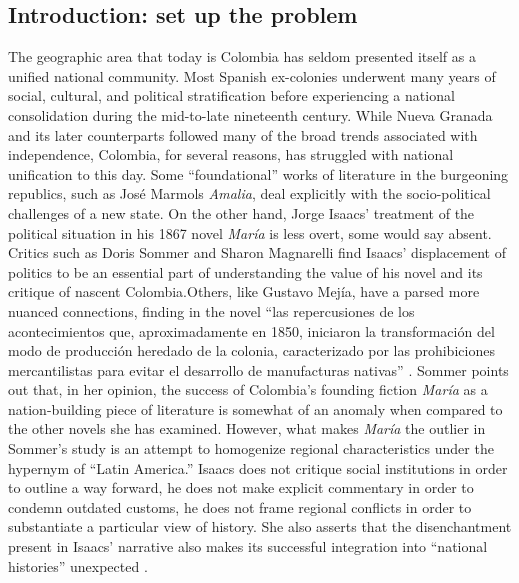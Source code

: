 \documentclass[12pt]{report}\usepackage[]{graphicx}\usepackage[]{color}
\makeatletter
\newcommand\iraggedright{%
	\let\\\@centercr\@rightskip\@flushglue \rightskip\@rightskip
	\leftskip\z@skip}
\makeatother
\begin{document}
\iraggedright
{}
\begin{spacing}{1.9}
	





\section{Introduction: set up the problem}
The geographic area that today is Colombia has seldom presented itself as a unified national community. Most Spanish ex-colonies underwent many years of social, cultural, and political stratification before experiencing a national consolidation during the mid-to-late nineteenth century. 
While Nueva Granada and its later counterparts followed many of the broad trends associated with independence, Colombia, for several reasons, has struggled with national unification to this day.
Some \enquote{foundational} works of literature in the burgeoning republics, such as José Marmols \textit{Amalia}, deal explicitly with the socio-political challenges of a new state.
On the other hand, Jorge Isaacs’ treatment of the political situation in his 1867 novel \textit{María} is less overt, some would say absent. Critics such as Doris Sommer and Sharon Magnarelli find Isaacs’ displacement of politics to be an essential part of understanding the value of his novel and its critique of nascent Colombia.Others, like Gustavo Mejía, have a parsed more nuanced connections, finding in the novel \enquote{las repercusiones de los acontecimientos que, aproximadamente en 1850, iniciaron la transformación del modo de producción heredado de la colonia, caracterizado por las prohibiciones mercantilistas para evitar el desarrollo de manufacturas nativas} \autocite[262]{Mejia1976}.
Sommer points out that, in her opinion, the success of Colombia's founding fiction \textit{María} as a nation-building piece of literature is somewhat of an anomaly when compared to the other novels she has examined. 
However, what makes \textit{María} the outlier in Sommer's study is an attempt to homogenize regional characteristics under the hypernym of \enquote{Latin America.}
Isaacs does not critique social institutions in order to outline a way forward, he does not make explicit commentary in order to condemn outdated customs, he does not frame regional conflicts in order to substantiate a particular view of history. 
She also asserts that the disenchantment present in Isaacs' narrative also makes its successful integration into \enquote{national histories} unexpected \autocite[30]{Sommer1991}.



\end{spacing}
\end{document}
